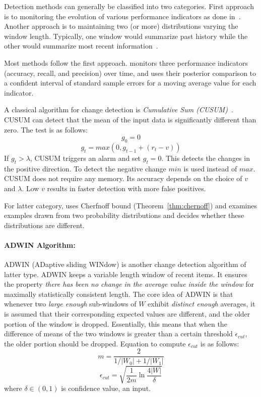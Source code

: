 Detection methods can generally be classified into two categories. First approach is to monitoring the evolution of various performance indicators as done in~\cite{klinkenberg98:changedetection, zeira04:changedetection}. Another approach is to maintaining two (or more) distributions varying the window length. Typically, one window would summarize past history while the other would summarize most recent information~\cite{kifer04:condrift}.

Most methods follow the first approach. \cite{klinkenberg98:changedetection} monitors three performance indicators (accuracy, recall, and precision) over time, and uses their posterior comparison to a confident interval of standard sample errors for a moving average value for each indicator.

A classical algorithm for change detection is \textit{Cumulative Sum (CUSUM)}~\cite{page54:cusum}. CUSUM can detect that the mean of the input data is significantly different than zero. The test is as follows:
\[
    g_0 = 0 
\]\[
    g_t = max (0, g_{t-1} + (r_t - v))
\]
If $g_t > \lambda$, CUSUM triggers an alarm and set $g_t = 0$. This detects the changes in the positive direction. To detect the negative change $min$ is used instead of $max$. CUSUM does not require any memory. Its accuracy depends on the choice of $v$ and $\lambda$. Low $v$ results in faster detection with more false positives.

For latter category, \cite{kifer04:condrift} uses Cherfnoff bound (Theorem~\ref{thm:chernoff}) and examines examples drawn from two probability distributions and decides whether these distributions are different.

\paragraph{ADWIN Algorithm:} ADWIN (ADaptive sliding WINdow) is another change detection algorithm of latter type. ADWIN keeps a variable length window of recent items. It ensures the property {\it there has been no change in the average value inside the window} for maximally statistically consistent length. The core idea of ADWIN is that whenever two {\it large enough} sub-windows of $W$ exhibit {\it distinct enough} averages, it is assumed that their corresponding expected values are different, and the older portion of the window is dropped. Essentially, this means that when the difference of means of the two windows is greater than a certain threshold $\epsilon_{cut}$, the older portion should be dropped. Equation to compute $\epsilon_{cut}$ is as follows:
\[
    m = \frac{2}{1/|W_0| + 1/|W_1|}
\]\[
    \epsilon_{cut} = \sqrt{\frac{1}{2m} \ln \frac{4 |W|}{\delta}}
\]
where $\delta \in (0, 1)$ is confidence value, an input.

